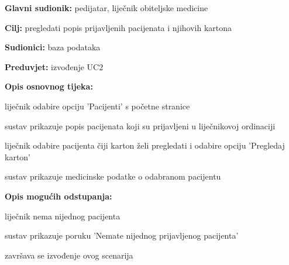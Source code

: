      
                    \noindent {}
					\begin{packed_item}
	
						\item \textbf{Glavni sudionik: }pedijatar, liječnik obiteljske medicine
						\item  \textbf{Cilj:} pregledati popis prijavljenih pacijenata i njihovih kartona
						\item  \textbf{Sudionici:} baza podataka
						\item  \textbf{Preduvjet:} izvođenje UC2
						\item  \textbf{Opis osnovnog tijeka:}
						
						\item[] \begin{packed_enum}
	
							\item liječnik odabire opciju 'Pacijenti' s početne stranice
							\item sustav prikazuje popis pacijenata koji su prijavljeni u liječnikovoj ordinaciji
							\item liječnik odabire pacijenta čiji karton želi pregledati i odabire opciju 'Pregledaj karton'
							\item sustav prikazuje medicinske podatke o odabranom pacijentu
						\end{packed_enum}
						
						\item  \textbf{Opis mogućih odstupanja:}
						
						\item[] \begin{packed_item}
	
							\item[2.a] liječnik nema nijednog pacijenta
							\item[] \begin{packed_enum}
								
								\item sustav prikazuje poruku 'Nemate nijednog prijavljenog pacijenta'
								\item završava se izvođenje ovog scenarija
							\end{packed_enum}
							
						\end{packed_item}
					\end{packed_item}


